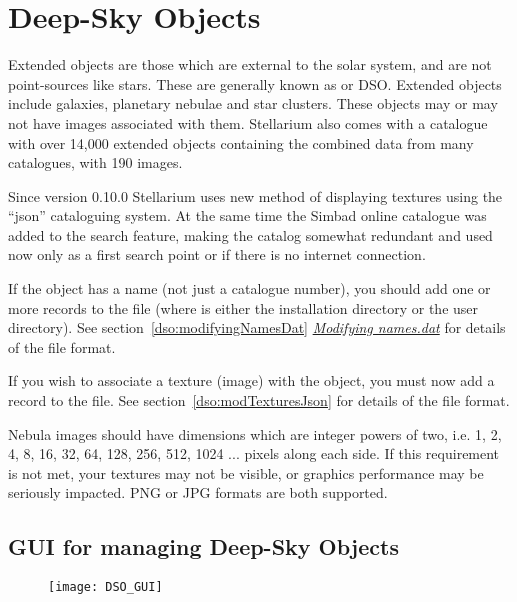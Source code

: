 
\chapter{Deep-Sky Objects}%
\label{ch:dso}

Extended objects are those which are external to the solar system, and
are not point-sources like stars. These are generally known as
 or DSO. Extended objects include
galaxies, planetary nebulae and star clusters. These objects may or
may not have images associated with them. Stellarium also comes with a
catalogue with over 14,000 extended objects containing the combined
data from many catalogues, with 190 images.

Since version 0.10.0 Stellarium uses new method of displaying
textures using the ``json'' cataloguing system. At the same time the
Simbad online catalogue was added to the search feature, making the catalog
somewhat redundant and used now only as a first search point or if there
is no internet connection.

If the object has a name (not just a catalogue number), you should add
one or more records to the  file
(where  is either the installation directory or the user
directory). See section~\ref{dso:modifyingNamesDat}
\emph{\protect\hyperlink{Modifyingux5fnames.dat}{Modifying names.dat}}
for details of the file format.

If you wish to associate a texture (image) with the object, you must now
add a record to the  file. See
section~\ref{dso:modTexturesJson} for details of the file format.

Nebula images should have dimensions which are integer powers of two,
i.e. 1, 2, 4, 8, 16, 32, 64, 128, 256, 512, 1024 ... pixels along each
side. If this requirement is not met, your textures may not be visible,
or graphics performance may be seriously impacted. PNG or JPG formats
are both supported.

\section{GUI for managing Deep-Sky Objects}%
\label{sec:dso:gui}

\begin{figure}[h]
\centering\texttt{[image: DSO\_GUI]}
\end{figure}

